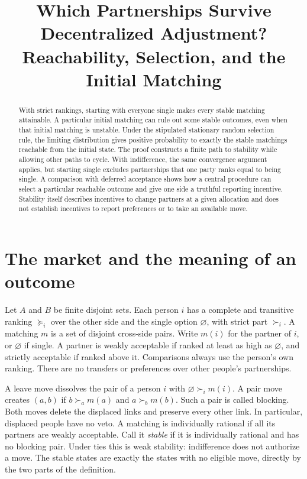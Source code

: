 \documentclass[11pt]{article}
\title{Which Partnerships Survive Decentralized Adjustment?\\
Reachability, Selection, and the Initial Matching}
\author{}
\date{}
\newcommand{\sg}{\varnothing}
\begin{document}
\maketitle

\begin{abstract}
With strict rankings, starting with everyone single makes every stable matching attainable. A particular initial matching can rule out some stable outcomes, even when that initial matching is unstable. Under the stipulated stationary random selection rule, the limiting distribution gives positive probability to exactly the stable matchings reachable from the initial state. The proof constructs a finite path to stability while allowing other paths to cycle. With indifference, the same convergence argument applies, but starting single excludes partnerships that one party ranks equal to being single. A comparison with deferred acceptance shows how a central procedure can select a particular reachable outcome and give one side a truthful reporting incentive. Stability itself describes incentives to change partners at a given allocation and does not establish incentives to report preferences or to take an available move.
\end{abstract}

\section{The market and the meaning of an outcome}

Let \(A\) and \(B\) be finite disjoint sets. Each person \(i\) has a complete and transitive ranking \(\succeq_i\) over the other side and the single option \(\sg\), with strict part \(\succ_i\). A matching \(m\) is a set of disjoint cross-side pairs. Write \(m(i)\) for the partner of \(i\), or \(\sg\) if single. A partner is weakly acceptable if ranked at least as high as \(\sg\), and strictly acceptable if ranked above it. Comparisons always use the person's own ranking. There are no transfers or preferences over other people's partnerships.

A leave move dissolves the pair of a person \(i\) with \(\sg\succ_i m(i)\). A pair move creates \((a,b)\) if \(b\succ_a m(a)\) and \(a\succ_b m(b)\). Such a pair is called blocking. Both moves delete the displaced links and preserve every other link. In particular, displaced people have no veto. A matching is individually rational if all its partners are weakly acceptable. Call it \emph{stable} if it is individually rational and has no blocking pair. Under ties this is weak stability: indifference does not authorize a move. The stable states are exactly the states with no eligible move, directly by the two parts of the definition.
\end{document}
